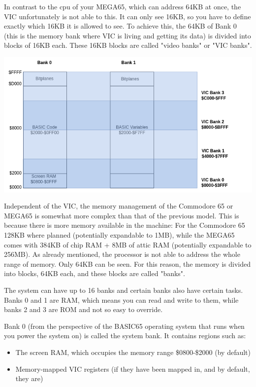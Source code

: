 In contrast to the cpu of your MEGA65, which can address 64KB at once, the VIC unfortunately is not able to this. It can only see 16KB, so you have to define exactly which 16KB it is allowed to see. To achieve this, the 64KB of Bank 0 (this is the memory bank where VIC is living and getting its data) is divided into blocks of 16KB each. These 16KB blocks are called "video banks" or "VIC banks".

\includegraphics[width=\linewidth]{images/graphics/vic-banks.png}

Independent of the VIC, the memory management of the Commodore 65 or MEGA65 is somewhat more complex than that of the previous model. This is because there is more memory available in the machine: For the Commodore 65 128KB where planned (potentially expandable to 1MB), while the MEGA65 comes with 384KB of chip RAM + 8MB of attic RAM (potentially expandable to 256MB). As already mentioned, the processor is not able to address the whole range of memory. Only 64KB can be seen. For this reason, the memory is divided into blocks, 64KB each, and these blocks are called "banks".

The system can have up to 16 banks and certain banks also have certain tasks. Banks 0 and 1 are RAM, which means you can read and write to them, while banks 2 and 3 are ROM and not so easy to override.

Bank 0 (from the perspective of the BASIC65 operating system that runs when you power the system on) is called the system bank. It contains regions such as:

\begin{itemize}
  \item The screen RAM, which occupies the memory range \$0800-\$2000 (by default)
  \item Memory-mapped VIC registers (if they have been mapped in, and by default, they are)
\end{itemize}

